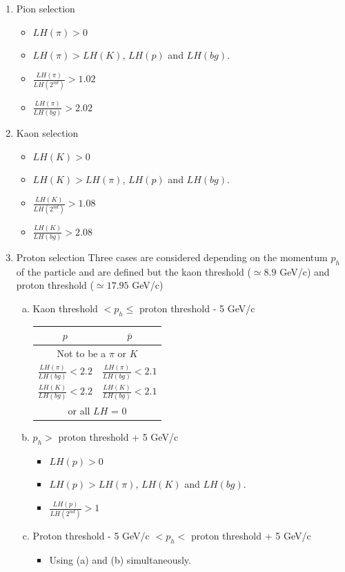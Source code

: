 \documentclass[letterpaper,12pt]{article}
\begin{document}
\begin{enumerate}
  \item Pion selection
  \begin{itemize}
    \item $LH(\pi) > 0$
    \item $LH(\pi) > LH(K)$, $LH(p)$ and $LH(bg)$.
    \item $\frac{LH(\pi)}{LH(2^{nd})}>1.02$
    \item $\frac{LH(\pi)}{LH(bg)}>2.02$
  \end{itemize}
  \item Kaon selection
  \begin{itemize}
    \item $LH(K) > 0$
    \item $LH(K) > LH(\pi)$, $LH(p)$ and $LH(bg)$.
    \item $\frac{LH(K)}{LH(2^{nd})}>1.08$
    \item $\frac{LH(K)}{LH(bg)}>2.08$
  \end{itemize}
  \item Proton selection
  Three cases are considered depending on the momentum $p_{h}$ of the particle and are defined but the kaon threshold ($\simeq 8.9$ GeV/c)
  and proton threshold ($\simeq 17.95$ GeV/c)
  \begin{enumerate}[(a)]
    \item Kaon threshold $< p_{h} \leq$ proton threshold - 5 GeV/c
	  \begin{center}
		  \begin{tabular}{c|c}
		    \hline
		     $p$ & $\bar{p}$ \\
		    \hline
				\multicolumn{2}{c}{Not to be a $\pi$ or $K$} \\
		    $\frac{LH(\pi)}{LH(bg)} < 2.2$ & $\frac{LH(\pi)}{LH(bg)} < 2.1$ \\
		    $\frac{LH(K)}{LH(bg)} < 2.2$ & $\frac{LH(K)}{LH(bg)} < 2.1$ \\
		    \hline
				\multicolumn{2}{c}{or all $LH$ = 0} \\
				\hline
		  \end{tabular}
		\end{center}
    \item $p_{h} >$ proton threshold + 5 GeV/c
    \begin{itemize}
      \item $LH(p) > 0$
      \item $LH(p) > LH(\pi)$, $LH(K)$ and $LH(bg)$.
      \item $\frac{LH(p)}{LH(2^{nd})}>1$
    \end{itemize}
    \item Proton threshold - 5 GeV/c $< p_{h} <$ proton threshold + 5 GeV/c
    \begin{itemize}
      \item Using (a) and (b) simultaneously.
    \end{itemize}
  \end{enumerate}
\end{enumerate}
\end{document}
